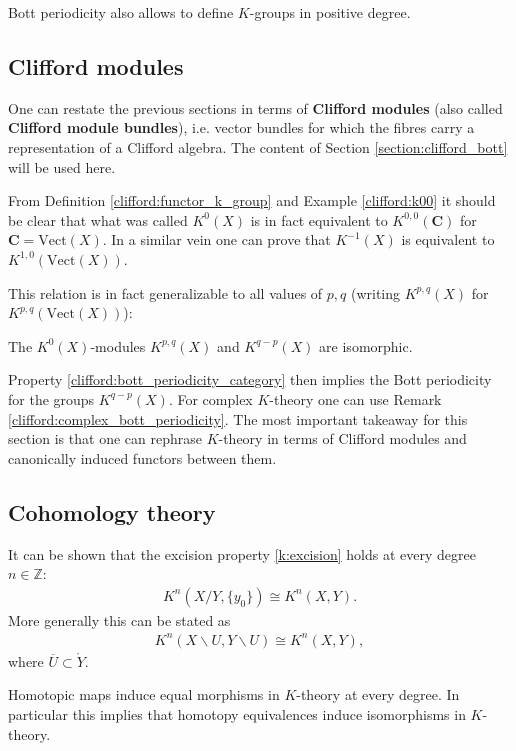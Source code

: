 {    \begin{remark}
        Bott periodicity also allows to define $K$-groups in positive degree.
    \end{remark}

\subsection{Clifford modules}

    One can restate the previous sections in terms of \textbf{Clifford modules} (also called \textbf{Clifford module bundles}), i.e. vector bundles for which the fibres carry a representation of a Clifford algebra. The content of Section \ref{section:clifford_bott} will be used here.

    From Definition \ref{clifford:functor_k_group} and Example \ref{clifford:k00} it should be clear that what was called $K^0(X)$ is in fact equivalent to $K^{0,0}(\mathbf{C})$ for $\mathbf{C}=\mathrm{Vect}(X)$. In a similar vein one can prove that $K^{-1}(X)$ is equivalent to $K^{1,0}(\mathrm{Vect}(X))$.

    This relation is in fact generalizable to all values of $p,q$ (writing $K^{p,q}(X)$ for $K^{p,q}(\mathrm{Vect}(X))$):
    \begin{property}
        The $K^0(X)$-modules $K^{p,q}(X)$ and $K^{q-p}(X)$ are isomorphic.
    \end{property}

    Property \ref{clifford:bott_periodicity_category} then implies the Bott periodicity for the groups $K^{q-p}(X)$. For complex $K$-theory one can use Remark \ref{clifford:complex_bott_periodicity}. The most important takeaway for this section is that one can rephrase $K$-theory in terms of Clifford modules and canonically induced functors between them.

\subsection{Cohomology theory}

    \begin{property}[Excision]
        It can be shown that the excision property \ref{k:excision} holds at every degree $n\in\mathbb{Z}$:
        \begin{gather}
            K^n(X/Y,\{y_0\})\cong K^n(X,Y).
        \end{gather}
        More generally this can be stated as
        \begin{gather}
            K^n(X\backslash U,Y\backslash U)\cong K^n(X,Y),
        \end{gather}
        where $\overline{U}\subset\mathring{Y}$.
    \end{property}
    \begin{property}
        Homotopic maps induce equal morphisms in $K$-theory at every degree. In particular this implies that homotopy equivalences induce isomorphisms in $K$-theory.
    \end{property}

}
